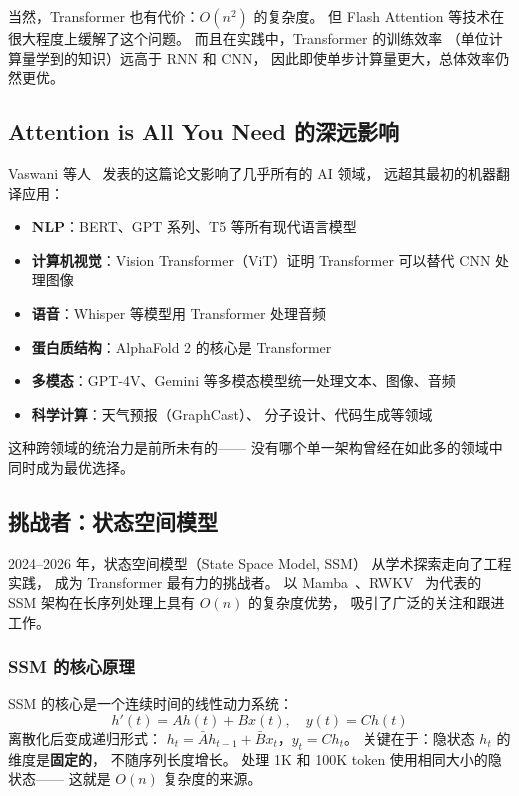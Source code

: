 当然，Transformer 也有代价：$O(n^2)$ 的复杂度。
但 Flash Attention 等技术在很大程度上缓解了这个问题。
而且在实践中，Transformer 的训练效率
（单位计算量学到的知识）远高于 RNN 和 CNN，
因此即使单步计算量更大，总体效率仍然更优。

\subsection{Attention is All You Need 的深远影响}

Vaswani 等人~\cite{vaswani2017attention}
发表的这篇论文影响了几乎所有的 AI 领域，
远超其最初的机器翻译应用：

\begin{itemize}[noitemsep]
  \item \textbf{NLP}：BERT、GPT 系列、T5 等所有现代语言模型
  \item \textbf{计算机视觉}：Vision Transformer（ViT）证明 Transformer
        可以替代 CNN 处理图像
  \item \textbf{语音}：Whisper 等模型用 Transformer 处理音频
  \item \textbf{蛋白质结构}：AlphaFold 2 的核心是 Transformer
  \item \textbf{多模态}：GPT-4V、Gemini 等多模态模型统一处理文本、图像、音频
  \item \textbf{科学计算}：天气预报（GraphCast）、
        分子设计、代码生成等领域
\end{itemize}

这种跨领域的统治力是前所未有的——
没有哪个单一架构曾经在如此多的领域中同时成为最优选择。

\subsection{挑战者：状态空间模型}
\label{sec:ssm-challengers}

2024--2026 年，状态空间模型（State Space Model, SSM）
从学术探索走向了工程实践，
成为 Transformer 最有力的挑战者。
以 Mamba~\cite{gu2024mamba}、RWKV~\cite{peng2025rwkv7} 为代表的
SSM 架构在长序列处理上具有 $O(n)$ 的复杂度优势，
吸引了广泛的关注和跟进工作。

\subsubsection{SSM 的核心原理}

SSM 的核心是一个连续时间的线性动力系统：
\begin{equation}
  h'(t) = A h(t) + B x(t), \quad y(t) = C h(t)
\end{equation}
离散化后变成递归形式：
$h_t = \bar{A} h_{t-1} + \bar{B} x_t$，$y_t = C h_t$。
关键在于：隐状态 $h_t$ 的维度是\textbf{固定的}，
不随序列长度增长。
处理 1K 和 100K token 使用相同大小的隐状态——
这就是 $O(n)$ 复杂度的来源。

